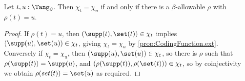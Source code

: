 \begin{proposition}
  \label{def:code_eq_code_iff}
  Let \( t, u : \Tang_\beta \).
  Then \( \chi_t = \chi_u \) if and only if there is a \( \beta \)-allowable \( \rho \) with \( \rho(t) = u \).
\end{proposition}
\begin{proof}
  If \( \rho(t) = u \), then \( (\supp(t), \set(t)) \in \chi_t \) implies \( (\supp(u), \set(u)) \in \chi_t \), giving \( \chi_t = \chi_u \) by \cref{prop:CodingFunction.ext}.
  Conversely if \( \chi_t = \chi_u \), then \( (\supp(u), \set(u)) \in \chi_t \), so there is \( \rho \) such that \( \rho(\supp(t)) = \supp(u) \), and \( (\rho(\supp(t)), \rho(\set(t))) \in \chi_t \), so by coinjectivity we obtain \( \rho(set(t)) = \set(u) \) as required.
\end{proof}

